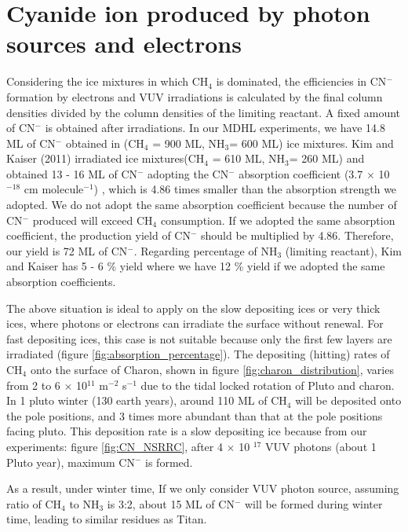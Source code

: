{\section{Cyanide ion produced by photon sources and electrons} %

Considering the ice mixtures in which CH$_4$ is dominated, the efficiencies in CN$^-$ formation by electrons and VUV irradiations is calculated by the final column densities divided by the column densities of the limiting reactant. A fixed amount of CN$^-$ is obtained after irradiations. In our MDHL experiments, we have 14.8 ML of CN$^-$ obtained in (CH$_4$ = 900 ML, NH$_3$= 600 ML) ice mixtures. Kim and Kaiser (2011) irradiated  ice mixtures(CH$_4$ = 610 ML, NH$_3$= 260 ML) and obtained 13 - 16 ML of CN$^-$ adopting the CN$^-$ absorption coefficient (3.7 $\times$ 10$^{-18}$ cm molecule$^{-1}$) \cite{georgieva2006computational}, which is 4.86 times smaller than the absorption strength we adopted. We do not adopt the same absorption coefficient because the number of CN$^-$ produced will exceed CH$_4$ consumption. If we adopted the same absorption coefficient, the production yield of CN$^-$ should be multiplied by 4.86. Therefore, our yield is 72 ML of CN$^-$. Regarding percentage of NH$_3$ (limiting reactant), Kim and Kaiser has 5 - 6 \% yield where we have 12 \% yield if we adopted the same absorption coefficients. 

The above situation is ideal to apply on the slow depositing ices or very thick ices, where photons or electrons can irradiate the surface without renewal. For fast depositing ices, this case is not suitable because only the first few layers are irradiated (figure \ref{fig:absorption_percentage}). The depositing (hitting) rates of CH$_4$ onto the surface of Charon, shown in figure \ref{fig:charon_distribution}, varies from 2 to 6 $\times$ 10$^{11}$ m$^{-2}$ s$^{-1}$ due to the tidal locked rotation of Pluto and charon. In 1 pluto winter (130 earth years), around 110 ML of CH$_4$ will be deposited onto the pole positions, and 3 times more abundant than that at the pole positions facing pluto. This deposition rate is a slow depositing ice because from our experiments: figure \ref{fig:CN_NSRRC}, after 4 $\times$ 10 $^{17}$ VUV photons (about 1 Pluto year), maximum CN$^-$ is formed.  

As a result, under winter time, If we only consider VUV photon source, assuming ratio of CH$_4$ to NH$_3$ is 3:2, about 15 ML of CN$^-$ will be formed during winter time, leading to similar residues as Titan.


}
